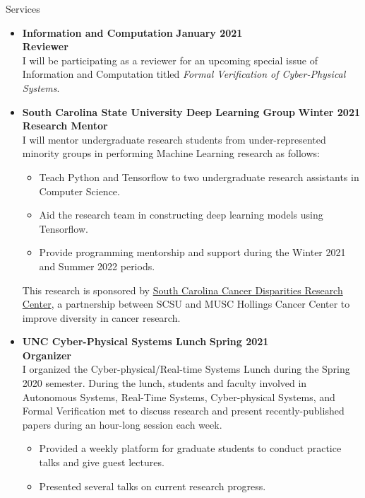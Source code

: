 \documentclass{resume} %
\begin{document}
\begin{rSection}{Services}

\begin{itemize}[leftmargin=*]
  \item {\bf Information and Computation} \hfill {\bf January 2021} \\
       {\bf Reviewer} \\
  I will be participating as a reviewer for an upcoming special issue of Information and Computation titled \textit{Formal Verification of Cyber-Physical Systems}.

  \item
      {\bf South Carolina State University Deep Learning Group} \hfill {\bf Winter 2021} \\
        {\bf Research Mentor} \\
      I will mentor undergraduate research students from under-represented minority groups in performing Machine Learning research as follows:

      \begin{itemize}[label=$\blackdiamond$]
        \item Teach Python and Tensorflow to two undergraduate research assistants in Computer Science.
        \item Aid the research team in constructing deep learning models using Tensorflow.
        \item Provide programming mentorship and support during the Winter 2021 and Summer 2022 periods.
      \end{itemize}

      This research is sponsored by \href{https://hollingscancercenter.musc.edu/outreach/statewide-commitments/sc-cadre}{South Carolina Cancer Disparities Research Center}, a partnership between SCSU and MUSC Hollings Cancer Center to improve diversity in cancer research.

      \item
      {\bf UNC Cyber-Physical Systems Lunch } \hfill {\bf Spring 2021}\\
      {\bf Organizer} \\
      I organized the Cyber-physical/Real-time Systems Lunch during the Spring 2020 semester. During the lunch, students and faculty involved in Autonomous Systems, Real-Time Systems, Cyber-physical Systems, and Formal Verification met to discuss research and present recently-published papers during an hour-long session each week.
      \begin{itemize}[label=$\blackdiamond$]
        \item Provided a weekly platform for graduate students to conduct practice talks and give guest lectures.
        \item Presented several talks on current research progress.
      \end{itemize}
\end{itemize}
\end{rSection}
\end{document}
